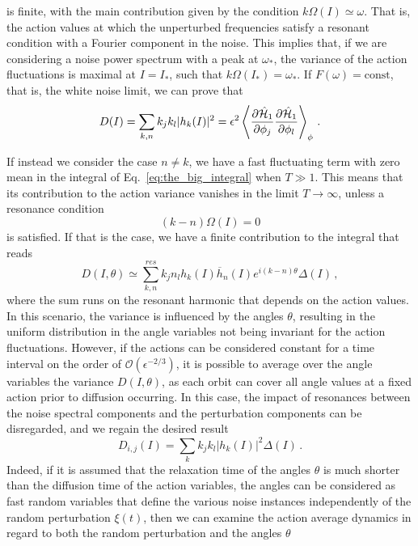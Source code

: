 is finite, with the main contribution given by the condition $k\Omega(I)\simeq \omega$. That is, the action values at which the unperturbed frequencies satisfy a resonant condition with a Fourier component in the noise. This implies that, if we are considering a noise power spectrum with a peak at $\omega_\ast$, the variance of the action fluctuations is maximal at $I=I_\ast$, such that $k\Omega(I_\ast)=\omega_\ast$. If $F(\omega)=\mathrm{const}$, that is, the white noise limit, we can prove that
\begin{equation}
    D(I)=\sum_{k,n} k_j k_l |h_k(I)|^2 =\epsilon^2\left \langle \frac{\partial \hat {\mathcal{H}}_1}{\partial \phi_j}\frac{\partial \hat {\mathcal{H}}_1}{\partial \phi_l}\right \rangle_\phi\,.
\end{equation}

If instead we consider the case $n\neq k$, we have a fast fluctuating term with zero mean in the integral of Eq.~\eqref{eq:the_big_integral} when $T\gg 1$. This means that its contribution to the action variance vanishes in the limit $T\to\infty$, unless a resonance condition
\begin{equation}
    (k-n)\Omega(I)=0
\end{equation}
is satisfied. If that is the case, we have a finite contribution to the integral that reads
\begin{equation}
    D(I,\theta)\simeq \sum_{k,n}^{res} k_j n_l h_k(I) \overline{h}_n(I) e^{i (k-n)\theta}\Delta (I)\,,
\end{equation}
where the sum runs on the resonant harmonic that depends on the action values. In this scenario, the variance is influenced by the angles $\theta$, resulting in the uniform distribution in the angle variables not being invariant for the action fluctuations. However, if the actions can be considered constant for a time interval on the order of $\mathcal{O}(\epsilon^{-2/3})$, it is possible to average over the angle variables the variance $D(I,\theta)$, as each orbit can cover all angle values at a fixed action prior to diffusion occurring. In this case, the impact of resonances between the noise spectral components and the perturbation components can be disregarded, and we regain the desired result
\begin{equation}
    D_{i,j}(I)=\sum_{k} k_j k_l |h_k(I)|^2 \Delta(I)\,.
    \label{diffcoef}
\end{equation}
Indeed, if it is assumed that the relaxation time of the angles $\theta$ is much shorter than the diffusion time of the action variables, the angles can be considered as fast random variables that define the various noise instances independently of the random perturbation $\xi(t)$, then we can examine the action average dynamics in regard to both the random perturbation and the angles $\theta$
